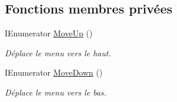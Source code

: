 \subsection*{Fonctions membres privées}
\begin{DoxyCompactItemize}
\item 
I\+Enumerator \mbox{\hyperlink{class_menu_visualization_u_i_a78a78af22e7a9248292601026c8429cb}{Move\+Up}} ()
\begin{DoxyCompactList}\small\item\em Déplace le menu vers le haut. \end{DoxyCompactList}\item 
I\+Enumerator \mbox{\hyperlink{class_menu_visualization_u_i_a65d11fcd4e858cf3bb0c4fdc95128030}{Move\+Down}} ()
\begin{DoxyCompactList}\small\item\em Déplace le menu vers le bas. \end{DoxyCompactList}\end{DoxyCompactItemize}
